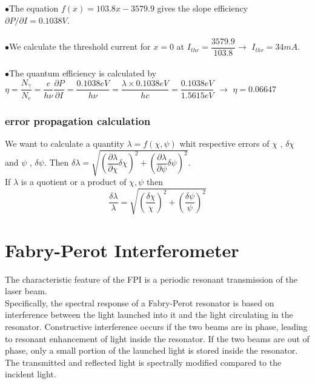 \documentclass[openany,11pt,a4paper]{book}
\begin{document}
$\bullet$The equation $f(x)= 103.8 x - 3579.9$ gives the slope efficiency  $\partial P  /  \partial I = 0.1038 V $.\\\\
$\bullet$We calculate the threshold current for $x=0$ at $I_{thr}=   \dfrac{3579.9}{103.8} \longrightarrow $ 
\textbf{$I_{thr}=34mA$}.\\\\
$\bullet$The 
quantum efficiency is calculated by
 $\eta = \dfrac{N_{\gamma}}{N_{e}} = \dfrac{e}{h \nu} \dfrac{\partial P}{\partial I}=
\dfrac{ 0.1038 e V}{h\nu}= \dfrac{\lambda \times 0.1038 e V}{hc}= \dfrac{0.1038 e V}{1.5615 eV} $ $\rightarrow$
 $\eta =0.06647$ 


\subsection{error propagation calculation}

We want to calculate a quantity $\lambda = f(\chi ,\psi)$ whit respective errors of $\chi$ , $\delta\chi$ and $\psi$ , $\delta\psi$. Then $\delta\lambda = \sqrt{(\dfrac{\partial \lambda}{\partial \chi} \delta\chi)^{2}+(\dfrac{\partial \lambda}{\partial \psi} \delta\psi)^{2}}$.\\
If $\lambda$ is a quotient or a product of $\chi,\psi$ then 
\begin{equation}
\dfrac{ \delta\lambda} {\lambda} = \sqrt{ (\dfrac{\delta \chi}{\chi})^{2}  + (\dfrac{\delta \psi}{\psi})^{2}   }
\end{equation}




\chapter{Fabry-Perot Interferometer}

The characteristic feature of the FPI is a periodic resonant transmission of the laser beam.\\ 

Specifically, the spectral response of a Fabry-Perot resonator is based on interference between the light launched into it and the light circulating in the resonator.
 Constructive interference occurs if the two beams are in phase, leading to resonant enhancement of light inside the resonator. If the two beams are out of phase, only a small portion of the launched light is stored inside the resonator. The transmitted and reflected light is spectrally modified compared to the incident light.\\
\end{document}
